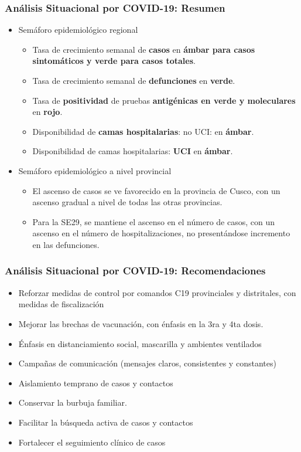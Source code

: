 \documentclass[xcolor=table]{beamer}
\begin{document}
\begin{frame}
	\frametitle{Análisis Situacional por COVID-19: Resumen}
	\vspace{-.5cm}
	\begin{itemize}
		\item Semáforo epidemiológico regional
		\begin{itemize}
			\item Tasa de crecimiento semanal de \textbf{\color{mycolor4}casos} en \textbf{\color{mycolor3}ámbar para casos sintomáticos y verde para casos totales}.
			\item Tasa de crecimiento semanal de \textbf{\color{mycolor4}defunciones} en \textbf{\color{mycolor3}verde}.
			\item Tasa de \textbf{\color{mycolor4}positividad} de pruebas \textbf{\color{mycolor4}antigénicas en verde y moleculares} en \textbf{\color{mycolor3}rojo}.
			\item Disponibilidad de \textbf{\color{mycolor4}camas hospitalarias}: no UCI: en \textbf{\color{mycolor3}ámbar}.
			\item Disponibilidad de camas hospitalarias: \textbf{\color{mycolor4}UCI} en \textbf{\color{mycolor3}ámbar}.
		\end{itemize} 
		\item Semáforo epidemiológico a nivel provincial
		\begin{itemize}
			\item El ascenso de casos se ve favorecido en la provincia de Cusco, con un ascenso gradual a nivel de todas las otras provincias.
			\item Para la SE29, se mantiene el ascenso en el número de casos, con un ascenso en el número de hospitalizaciones, no presentándose incremento en las defunciones.
		\end{itemize}
	\end{itemize}
\end{frame}

\begin{frame}[label=recomendaciones]
	\frametitle{Análisis Situacional por COVID-19: Recomendaciones}
	\vspace{-.5cm}
	\begin{itemize}
			\item Reforzar medidas de control por comandos C19 provinciales y distritales, con medidas de fiscalización
			\item Mejorar las brechas de vacunación, con énfasis en la 3ra y 4ta dosis.
			\item Énfasis en distanciamiento social, mascarilla y ambientes ventilados
			\item Campañas de comunicación (mensajes claros, consistentes y constantes)
			\item Aislamiento temprano de casos y contactos
			\item Conservar la burbuja familiar. 
			\item Facilitar la búsqueda activa de casos y contactos
			\item Fortalecer el seguimiento clínico de casos			
	\end{itemize} 
\end{frame}
\end{document}
